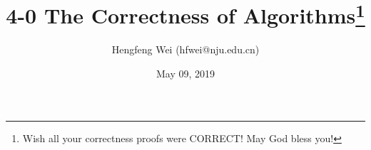 \documentclass{tufte-handout}
\title{4-0 The Correctness of Algorithms\thanks{Wish all your correctness proofs were \uppercase{correct}! May God bless you!}}
\author[hengxin]{Hengfeng Wei {\normalsize (hfwei@nju.edu.cn)}}
\date{May 09, 2019}
\begin{document}
\begin{CJK*}{UTF8}{gbsn}

\maketitle








\end{CJK*}
\end{document}
